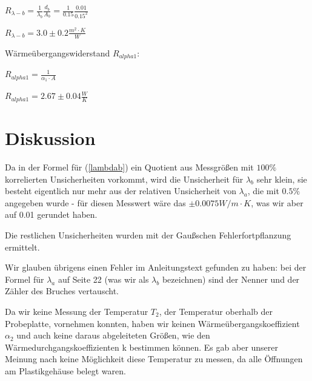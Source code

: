 \documentclass[12pt,a4paper,twopage]{article}
\begin{document}
\( R_{\lambda-b} = \frac{1}{\lambda_b}\frac{d_b}{A_b} = \frac{1}{0.15}\frac{0.01}{0.15^2} \)

\begin{center}
\(\boxed{R_{\lambda-b} = 3.0 \pm 0.2 \frac{m^2 \cdot K}{W}} \)
\end{center}



Wärmeübergangswiderstand $R_{alpha1}$:

\( R_{alpha1} = \frac{1}{\alpha_1 \cdot A} \)
\begin{center}
\( \boxed{ R_{alpha1} = 2.67 \pm 0.04 \frac{W}{K} }\)
\end{center}


\section{Diskussion}
		
Da in der Formel für (\ref{lambdab}) ein Quotient aus Messgrößen mit $100\%$ korrelierten Unsicherheiten vorkommt, wird die Unsicherheit für $\lambda_b$ sehr klein, sie besteht eigentlich nur mehr aus der relativen Unsicherheit von $\lambda_a$, die mit $0.5\%$ angegeben wurde - für diesen Messwert wäre das $ \pm 0.0075 W/m\cdot K$, was wir aber auf 0.01 gerundet haben.
						
Die restlichen Unsicherheiten wurden mit der Gaußschen Fehlerfortpflanzung ermittelt.

Wir glauben übrigens einen Fehler im Anleitungstext gefunden zu haben: bei der Formel für $\lambda_a$ auf Seite 22 (was wir als $\lambda_b$ bezeichnen) sind der Nenner und der Zähler des Bruches vertauscht.
						
Da wir keine Messung der Temperatur $T_2$, der Temperatur oberhalb der Probeplatte, vornehmen konnten, haben wir keinen Wärmeübergangskoeffizient $\alpha_2$ und auch keine daraus abgeleiteten Größen, wie den Wärmedurchgangskoeffizienten k bestimmen können. Es gab aber unserer Meinung nach keine Möglichkeit diese Temperatur zu messen, da alle Öffnungen am Plastikgehäuse belegt waren.  								
\end{document}
